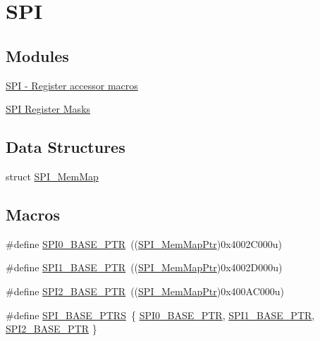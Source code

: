 \hypertarget{group___s_p_i___peripheral}{}\section{S\+P\+I}
\label{group___s_p_i___peripheral}
\subsection*{Modules}
\begin{DoxyCompactItemize}
\item 
\hyperlink{group___s_p_i___register___accessor___macros}{S\+P\+I -\/ Register accessor macros}
\item 
\hyperlink{group___s_p_i___register___masks}{S\+P\+I Register Masks}
\end{DoxyCompactItemize}
\subsection*{Data Structures}
\begin{DoxyCompactItemize}
\item 
struct \hyperlink{struct_s_p_i___mem_map}{S\+P\+I\+\_\+\+Mem\+Map}
\end{DoxyCompactItemize}
\subsection*{Macros}
\begin{DoxyCompactItemize}
\item 
\#define \hyperlink{group___s_p_i___peripheral_ga851f64a97b5919c1f99a34db5918b3b4}{S\+P\+I0\+\_\+\+B\+A\+S\+E\+\_\+\+P\+T\+R}~((\hyperlink{group___s_p_i___peripheral_ga7e4e9921e4d56bdbb10a04e77743ff5e}{S\+P\+I\+\_\+\+Mem\+Map\+Ptr})0x4002\+C000u)
\item 
\#define \hyperlink{group___s_p_i___peripheral_gae28fd789e0602a32076c1c13ca39f5af}{S\+P\+I1\+\_\+\+B\+A\+S\+E\+\_\+\+P\+T\+R}~((\hyperlink{group___s_p_i___peripheral_ga7e4e9921e4d56bdbb10a04e77743ff5e}{S\+P\+I\+\_\+\+Mem\+Map\+Ptr})0x4002\+D000u)
\item 
\#define \hyperlink{group___s_p_i___peripheral_ga78714a4b750aa56fc56d1d223a560069}{S\+P\+I2\+\_\+\+B\+A\+S\+E\+\_\+\+P\+T\+R}~((\hyperlink{group___s_p_i___peripheral_ga7e4e9921e4d56bdbb10a04e77743ff5e}{S\+P\+I\+\_\+\+Mem\+Map\+Ptr})0x400\+A\+C000u)
\item 
\#define \hyperlink{group___s_p_i___peripheral_ga3a16fecfe27c2052ab60e014be3f66f6}{S\+P\+I\+\_\+\+B\+A\+S\+E\+\_\+\+P\+T\+R\+S}~\{ \hyperlink{group___s_p_i___peripheral_ga851f64a97b5919c1f99a34db5918b3b4}{S\+P\+I0\+\_\+\+B\+A\+S\+E\+\_\+\+P\+T\+R}, \hyperlink{group___s_p_i___peripheral_gae28fd789e0602a32076c1c13ca39f5af}{S\+P\+I1\+\_\+\+B\+A\+S\+E\+\_\+\+P\+T\+R}, \hyperlink{group___s_p_i___peripheral_ga78714a4b750aa56fc56d1d223a560069}{S\+P\+I2\+\_\+\+B\+A\+S\+E\+\_\+\+P\+T\+R} \}
\end{DoxyCompactItemize}
